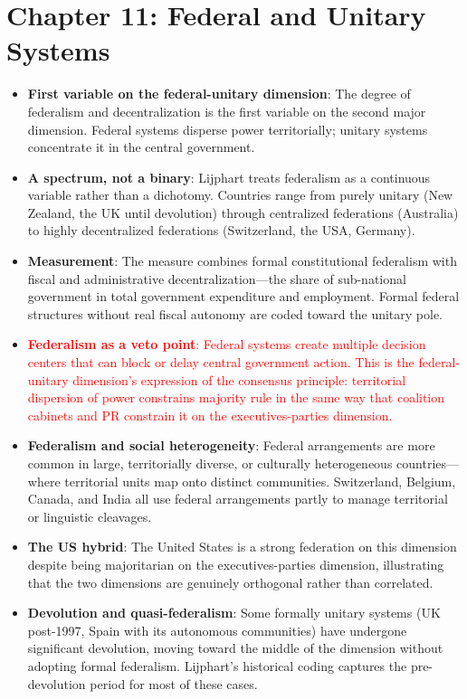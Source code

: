\documentclass[12pt]{article}
\begin{document}
\section{Chapter 11: Federal and Unitary Systems}

\begin{itemize}[leftmargin=*, itemsep=4pt]
    \item \textbf{First variable on the federal-unitary dimension}: The degree of federalism and decentralization is the first variable on the second major dimension. Federal systems disperse power territorially; unitary systems concentrate it in the central government.
    \item \textbf{A spectrum, not a binary}: Lijphart treats federalism as a continuous variable rather than a dichotomy. Countries range from purely unitary (New Zealand, the UK until devolution) through centralized federations (Australia) to highly decentralized federations (Switzerland, the USA, Germany).
    \item \textbf{Measurement}: The measure combines formal constitutional federalism with fiscal and administrative decentralization---the share of sub-national government in total government expenditure and employment. Formal federal structures without real fiscal autonomy are coded toward the unitary pole.
    \item \textcolor{red}{\textbf{Federalism as a veto point}: Federal systems create multiple decision centers that can block or delay central government action. This is the federal-unitary dimension's expression of the consensus principle: territorial dispersion of power constrains majority rule in the same way that coalition cabinets and PR constrain it on the executives-parties dimension.}
    \item \textbf{Federalism and social heterogeneity}: Federal arrangements are more common in large, territorially diverse, or culturally heterogeneous countries---where territorial units map onto distinct communities. Switzerland, Belgium, Canada, and India all use federal arrangements partly to manage territorial or linguistic cleavages.
    \item \textbf{The US hybrid}: The United States is a strong federation on this dimension despite being majoritarian on the executives-parties dimension, illustrating that the two dimensions are genuinely orthogonal rather than correlated.
    \item \textbf{Devolution and quasi-federalism}: Some formally unitary systems (UK post-1997, Spain with its autonomous communities) have undergone significant devolution, moving toward the middle of the dimension without adopting formal federalism. Lijphart's historical coding captures the pre-devolution period for most of these cases.
\end{itemize}
\end{document}
